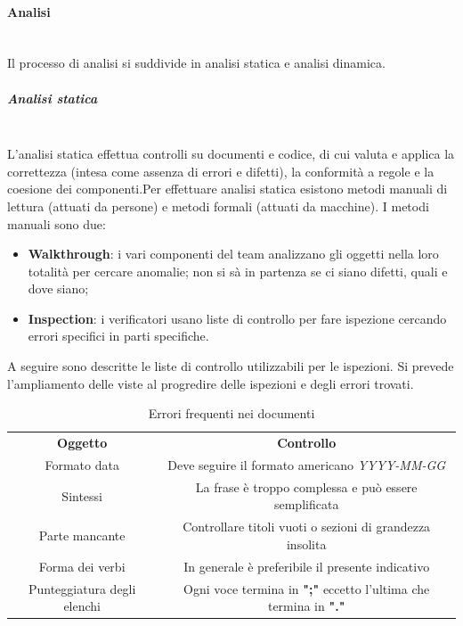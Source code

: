 		\paragraph{Analisi} \mbox{}\\
		Il processo di analisi si suddivide in analisi statica e analisi dinamica.
			\subparagraph{Analisi statica} \mbox{}\\
			L'analisi statica effettua controlli su documenti e codice, di cui valuta e applica la correttezza (intesa come assenza di errori e difetti), la conformità a regole e la coesione dei componenti.\newline Per effettuare analisi statica esistono metodi manuali di lettura (attuati da persone) e metodi formali (attuati da macchine). I metodi manuali sono due:
			\begin{itemize}
				\item \textbf{Walkthrough}: i vari componenti del team analizzano gli oggetti nella loro totalità per cercare anomalie; non si sà in partenza se ci siano difetti, quali e dove siano;
				\item \textbf{Inspection}: i verificatori usano liste di controllo per fare ispezione cercando errori specifici in parti specifiche.
			\end{itemize}
			A seguire sono descritte le liste di controllo utilizzabili per le ispezioni. Si prevede l'ampliamento delle viste al progredire delle ispezioni e degli errori trovati.
			
			
			
			\begin{table}[H]
				\centering\renewcommand{\arraystretch}{1.5}
				\begin{tabular}{c|c}
					
					\rowcolorhead
					{ \textbf{Oggetto}} &
					{ \textbf{Controllo} }\\
					
					\rowcolorlight
					{\colorbody Formato data} & { Deve seguire il formato americano \textit{YYYY-MM-GG}} 
					\\
					
					\rowcolordark
					{\colorbody Sintessi} & {  La frase è troppo complessa e può essere semplificata } 
					\\	
					
					\rowcolorlight
					{\colorbody Parte mancante} & { Controllare titoli vuoti o sezioni di grandezza insolita} 
					\\
					
					\rowcolordark
					{\colorbody Forma dei verbi} & { In generale è preferibile il presente indicativo} 
					\\
					
					\rowcolorlight
					{ Punteggiatura degli elenchi} & { Ogni voce termina in \textbf{";"} eccetto l'ultima che termina in \textbf{"."}} 
					\\
				\end{tabular}
				\caption{Errori frequenti nei documenti}
			\end{table}
			
